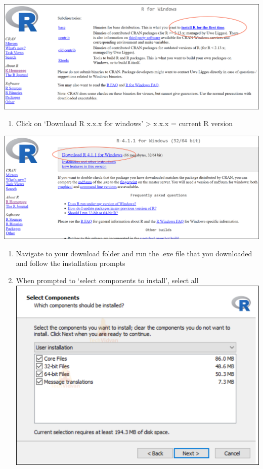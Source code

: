 \documentclass[
]{book}
\providecommand{\tightlist}{%
  \setlength{\itemsep}{0pt}\setlength{\parskip}{0pt}}
\begin{document}
\includegraphics{tutorial_screenshots/install_r1.png}

\begin{enumerate}
\def\labelenumi{\arabic{enumi}.}
\setcounter{enumi}{3}
\tightlist
\item
  Click on `Download R x.x.x for windows'
  \textgreater{} x.x.x = current R version
\end{enumerate}

\includegraphics{tutorial_screenshots/download_r_current.png}

\begin{enumerate}
\def\labelenumi{\arabic{enumi}.}
\setcounter{enumi}{4}
\tightlist
\item
  Navigate to your download folder and run the .exe file that you downloaded and follow the installation prompts\\
\item
  When prompted to `select components to install', select all\\
  \includegraphics{tutorial_screenshots/install_r_components.png}
\end{enumerate}
\end{document}
